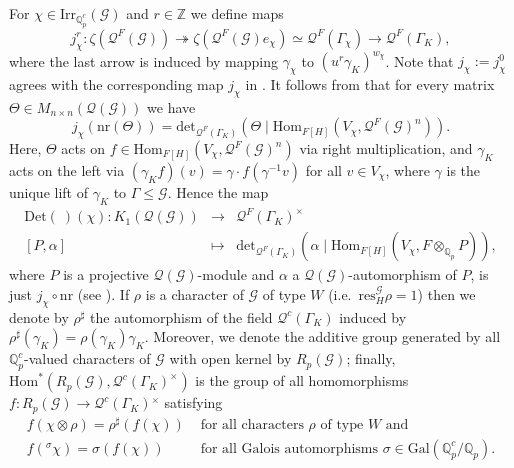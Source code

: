 \documentclass[12pt]{amsart}
\theoremstyle{plain}
\theoremstyle{remark}
\theoremstyle{definition}
\numberwithin{equation}{section}
\begin{document}
For $\chi \in {\mathrm{Irr}}_{{\mathbb{Q}}_{p}^{c}}(\mathcal{G})$ and $r \in {\mathbb{Z}}$ we define maps
\[
j_{\chi}^{r}: \zeta(\mathcal{Q}^{F} (\mathcal{G})) \twoheadrightarrow \zeta(\mathcal{Q}^{F} (\mathcal{G})e_{\chi}) \simeq \mathcal{Q}^{F}(\Gamma_{\chi}) \rightarrow  \mathcal{Q}^{F}(\Gamma_{K}),
\]
where the last arrow is induced by mapping $\gamma_{\chi}$ to 
$(u^{r}\gamma_{K})^{w_{\chi}}$.
Note that $j_{\chi} := j_{\chi}^{0}$ agrees with the corresponding map $j_{\chi}$ in \cite{MR2114937}.
It follows from \cite[Proposition 6 (3)]{MR2114937} that for every matrix $\Theta \in M_{n \times n} (\mathcal{Q}(\mathcal{G}))$ we have
\begin{equation} \label{eqn:jchi-det}
j_{\chi} ({\mathrm{nr}}(\Theta)) = \mathrm{det}_{\mathcal{Q}^{F}(\Gamma_{K})} (\Theta \mid {\mathrm{Hom}}_{F[H]}(V_{\chi},  \mathcal{Q}^{F}(\mathcal{G})^n)).
\end{equation}
Here, $\Theta$ acts on $f \in {\mathrm{Hom}}_{F[H]}(V_{\chi},  \mathcal{Q}^{F}(\mathcal{G})^{n})$ via right multiplication,
and $\gamma_{K}$ acts on the left via $(\gamma_{K} f)(v) = \gamma \cdot f(\gamma^{-1} v)$ for all $v \in V_{\chi}$,
where $\gamma$ is the unique lift of $\gamma_{K}$ to $\Gamma \leq \mathcal{G}$.
Hence the map
\begin{eqnarray*}
{\mathrm{Det}}(~)(\chi): K_{1}(\mathcal{Q}(\mathcal{G})) & \rightarrow & \mathcal{Q}^{F}(\Gamma_{K})^{\times} \\
 {[P,\alpha]}& \mapsto & \mathrm{det}_{\mathcal{Q}^{F}(\Gamma_{K})} (\alpha \mid {\mathrm{Hom}}_{F[H]}(V_{\chi},  F \otimes_{{\mathbb{Q}}_{p}} P)),
\end{eqnarray*}
where $P$ is a projective $\mathcal{Q}(\mathcal{G})$-module and $\alpha$ a $\mathcal{Q}(\mathcal{G})$-automorphism of $P$, is just $j_{\chi} \circ {\mathrm{nr}}$ (see \cite[\S 3, p.558]{MR2114937}).
If $\rho$ is a character of $\mathcal{G}$ of type $W$ (i.e.~${\mathrm{res}}^{\mathcal{G}}_H \rho = 1$)
then we denote by
$\rho^{\sharp}$ the automorphism of the field $\mathcal{Q}^{c}(\Gamma_{K})$ induced by
$\rho^{\sharp}(\gamma_{K}) = \rho(\gamma_{K}) \gamma_{K}$. 
Moreover, we denote the additive group generated by all ${\mathbb{Q}}_{p}^{c}$-valued
characters of $\mathcal{G}$ with open kernel by $R_p(\mathcal{G})$; finally, 
${\mathrm{Hom}}^{\ast}(R_{p}( \mathcal{G}), \mathcal{Q}^{c}(\Gamma_{K})^{\times})$
is the group of all homomorphisms 
$f: R_p(\mathcal{G}) \rightarrow \mathcal{Q}^{c}(\Gamma_{K}){^{\times}}$ satisfying
\[
\begin{array}{ll}
f(\chi \otimes \rho) = \rho^{\sharp}(f(\chi)) & \mbox{ for all characters } \rho \mbox{ of type } W \mbox{ and}\\
f({}^{\sigma}\chi) = \sigma(f(\chi)) & \mbox{ for all Galois automorphisms } \sigma \in {\mathrm{Gal}}({\mathbb{Q}}_{p}^{c}/{\mathbb{Q}}_{p}).
\end{array}
\]
\end{document}

